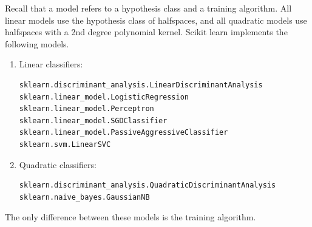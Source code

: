 \documentclass[10pt]{exam}
\theoremstyle{definition}
\newtheorem{fact}{Fact}
\newcommand{\Ein}{E_{\text{in}}}
\begin{document}
Recall that a model refers to a hypothesis class and a training algorithm.
All linear models use the hypothesis class of halfspaces, and all quadratic models use halfspaces with a 2nd degree polynomial kernel.
Scikit learn implements the following models.

\begin{enumerate}
    \item
Linear classifiers:

\begin{verbatim}
sklearn.discriminant_analysis.LinearDiscriminantAnalysis
sklearn.linear_model.LogisticRegression
sklearn.linear_model.Perceptron
sklearn.linear_model.SGDClassifier
sklearn.linear_model.PassiveAggressiveClassifier
sklearn.svm.LinearSVC
\end{verbatim}

\item
Quadratic classifiers:

\begin{verbatim}
sklearn.discriminant_analysis.QuadraticDiscriminantAnalysis
sklearn.naive_bayes.GaussianNB
\end{verbatim}
\end{enumerate}


%
\noindent
The only difference between these models is the training algorithm.
\end{document}
